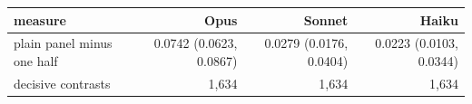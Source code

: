 \begin{tabular}{p{6.6cm}rrr}
\toprule
measure & Opus & Sonnet & Haiku \\
\midrule
plain panel minus one half & 0.0742 (0.0623, 0.0867) & 0.0279 (0.0176, 0.0404) & 0.0223 (0.0103, 0.0344) \\
decisive contrasts & 1,634 & 1,634 & 1,634 \\

\end{tabular}

